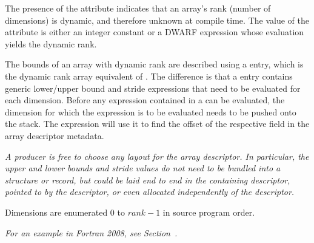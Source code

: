 The presence of 
the\hypertarget{chap:DWATrankofdynamicarray}{\DWATrankINDX}
attribute indicates that an array's rank
(number of dimensions) is dynamic, and therefore unknown at compile
time. The value of the \DWATrankDEFN{} attribute is either an integer constant
or a DWARF expression whose evaluation yields the dynamic rank.

The bounds of an array with dynamic rank are described using a
\DWTAGgenericsubrange{} entry, which  
is the dynamic rank array equivalent of
\DWTAGsubrangetype. The
difference is that a \DWTAGgenericsubrange{} entry contains generic
lower/upper bound and stride expressions that need to be evaluated for
each dimension. Before any expression contained in a
\DWTAGgenericsubrange{} can be evaluated, the dimension for which the
expression is to be evaluated needs to be pushed onto the stack. The
expression will use it to find the offset of the respective field in
the array descriptor metadata.

\textit{A producer is free to choose any layout for the
  array descriptor. In particular, the upper and lower bounds and
  stride values do not need to be bundled into a structure or record,
  but could be laid end to end in the containing descriptor, pointed
  to by the descriptor, or even allocated independently of the
  descriptor.}

Dimensions are enumerated $0$ to $\mathit{rank}-1$ in source program
order.

\textit{For an example in Fortran 2008, see
  Section~.}

